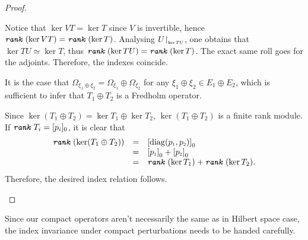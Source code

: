 \begin{proposicao}
\begin{proof}
\begin{itroman}
\item Notice that $\ker VT = \ker T$ since $V$ is invertible, hence $\texttt{\textit{rank}}\,(\ker VT) = \texttt{\textit{rank}}\,(\ker T)$. Analysing $U\sub\restrita{\ker TU}$, one obtains that $\ker TU \simeq \ker T$, thus $\texttt{\textit{rank}}\,(\ker TU) = \texttt{\textit{rank}}\,(\ker T)$. The exact same roll goes for the adjoints. Therefore, the indexes coincide.
\item  It is the case that $\Omega_{\xi_1 \oplus \xi_2} = \Omega_{\xi_1} \oplus \Omega_{\xi_2}$ for any $\xi_1\oplus \xi_2 \in E_1\oplus E_2$, which is sufficient to infer that $T_1\oplus T_2$ is a Fredholm operator.

Since $\ker(T_1 \oplus T_2) = \ker T_1 \oplus \ker T_2$, $\ker(T_1 \oplus T_2)$ is a finite rank module. If $\texttt{\textit{rank}}\, T_i = [p_i]_0$, it is clear that 
$$
\begin{array}{rcl}
    \rank(\ker(T_1\oplus T_2)) &=& \left[\diag(\sub p1, \sub p2)\right]_0 \\
    &=& \left[\sub p1\right]_0+ \left[\sub p2\right]_0 \\
    &=& \rank(\ker T_1) + \rank(\ker T_2).
\end{array}
$$
Therefore, the desired index relation follows.
\qedhere
\end{itroman}
\end{proof}
\end{proposicao}

Since our compact operators aren't necessarily the same as in Hilbert space case, the index invariance under compact perturbations needs to be handed carefully. 


